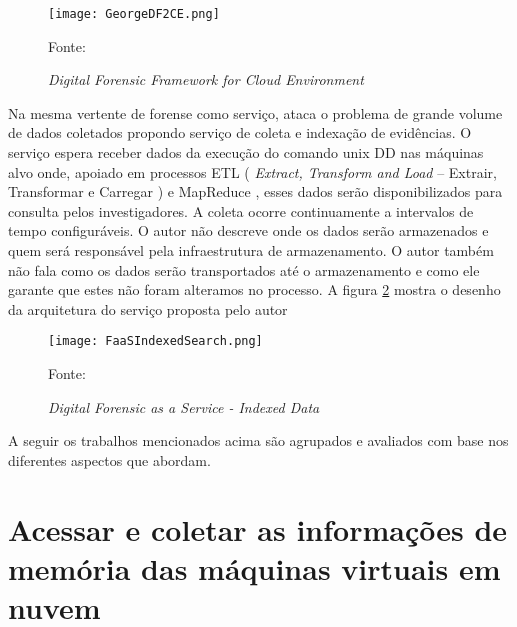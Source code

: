 \begin{figure}[htb!]
\footnotesize
\caption{\textit{Digital Forensic Framework for Cloud Environment}}
\texttt{[image: GeorgeDF2CE.png]}
\centering
\label{fig:GeorgeDF2CE}
\begin{center}
Fonte: \cite{GeorgeDF2CE:2012} 
\end{center}
\end{figure}

Na mesma vertente de forense como serviço, \cite{FaaSIndexedSearch:2012} ataca o problema de grande volume de dados coletados propondo serviço de coleta e indexação de evidências.
%
O serviço espera receber dados da execução do comando unix DD \cite{UnixManPagesDD} nas máquinas alvo onde, apoiado em processos ETL ( \textit{Extract, Transform and Load} -- Extrair, Transformar e Carregar ) e MapReduce \cite{WikipediaMapReduce}, esses dados serão disponibilizados para consulta pelos investigadores.
%
A coleta ocorre continuamente a intervalos de tempo configuráveis.
%
O autor não descreve onde os dados serão armazenados e quem será responsável pela infraestrutura de armazenamento.
%
O autor também não fala como os dados serão transportados até o armazenamento e como ele garante que estes não foram alteramos no processo.
%
A figura \ref{fig:FaaSIndexedSearch} mostra o desenho da arquitetura do serviço proposta pelo autor

\begin{figure}[htb!]
\footnotesize
\caption{\textit{Digital Forensic as a Service - Indexed Data}}
\texttt{[image: FaaSIndexedSearch.png]}
\centering
\label{fig:FaaSIndexedSearch}
\begin{center}
Fonte: \cite{FaaSIndexedSearch:2012} 
\end{center}
\end{figure}

A seguir os trabalhos mencionados acima são agrupados e avaliados com base nos diferentes aspectos que abordam.

\section{Acessar e coletar as informações de memória das máquinas virtuais em nuvem}
\label{sec:coletadeevidencia}

